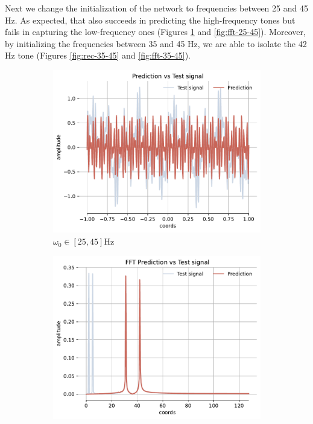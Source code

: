 Next we change the initialization of the network to frequencies between 25 and 45 Hz. As expected, that also succeeds in predicting the high-frequency tones but fails in capturing the low-frequency ones (Figures \ref{fig:rec-25-45} and \ref{fig:fft-25-45}). Moreover, by initializing the frequencies between 35 and 45 Hz, we are able to isolate the 42 Hz tone (Figures \ref{fig:rec-35-45} and \ref{fig:fft-35-45}).

\begin{figure}[h!]
    \centering
    \begin{subfigure}[b]{0.38\textwidth}
        \centering
        \includegraphics[width=\textwidth]{img/ch3/prediction_w25-45_2pi.pdf}
        \caption{$\omega_0 \in [25, 45]$Hz}
        \label{fig:rec-25-45}
    \end{subfigure}
    \begin{subfigure}[b]{0.38\textwidth}
        \centering
        \includegraphics[width=\textwidth]{img/ch3/fft_w25-45.pdf}

\end{subfigure}
\end{figure}
